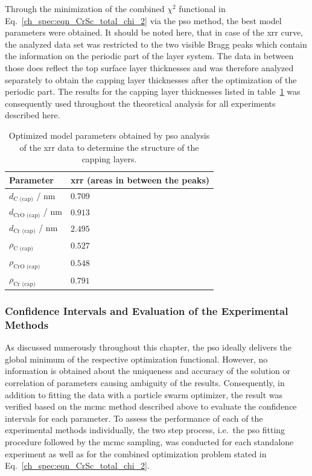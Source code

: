 Through the minimization of the combined $\chi^2$ functional in Eq.~\eqref{ch_spec:eqn_CrSc_total_chi_2} via the \gls{pso} method, the best model parameters were obtained. It should be noted here, that in case of the \gls{xrr} curve, the analyzed data set was restricted to the two visible Bragg peaks which contain the information on the periodic part of the layer system. The data in between those does reflect the top surface layer thicknesses and was therefore analyzed separately to obtain the capping layer thicknesses after the optimization of the periodic part. The results for the capping layer thicknesses listed in table~\ref{ch_spec:tbl_CrSc_best_model_capping} was consequently used throughout the theoretical analysis for all experiments described here.
\begin{table}[htbp]
\centering
\caption{Optimized model parameters obtained by \gls{pso} analysis of the \gls{xrr} data to determine the structure of the capping layers.}
\label{ch_spec:tbl_CrSc_best_model_capping}
\begin{tabular}{@{}ll@{}}
\toprule
Parameter &  \gls{xrr} (areas in between the peaks)\\ \midrule
$d_\text{C (cap)}$ / nm  & $0.709$ \\ 
$d_\text{CrO (cap)}$ / nm  & $0.913$ \\ 
$d_\text{Cr (cap)}$ / nm  & $ 2.495$ \\ 
$\rho_\text{C (cap)}$ & $0.527$\\ 
$\rho_\text{CrO (cap)}$& $0.548$\\
$\rho_\text{Cr (cap)}$ & $0.791$\\
 \bottomrule
\end{tabular}
\end{table}

\subsubsection{Confidence Intervals and Evaluation of the Experimental Methods}
As discussed numerously throughout this chapter, the \gls{pso} ideally delivers the global minimum of the respective optimization functional. However, no information is obtained about the uniqueness and accuracy of the solution or correlation of parameters causing ambiguity of the results. Consequently, in addition to fitting the data with a particle swarm optimizer, the result was verified based on the \gls{mcmc} method described above to evaluate the confidence intervals for each parameter. To assess the performance of each of the experimental methods individually, the two step process, i.e.~the \gls{pso} fitting procedure followed by the \gls{mcmc} sampling, was conducted for each standalone experiment as well as for the combined optimization problem stated in Eq.~\eqref{ch_spec:eqn_CrSc_total_chi_2}.

